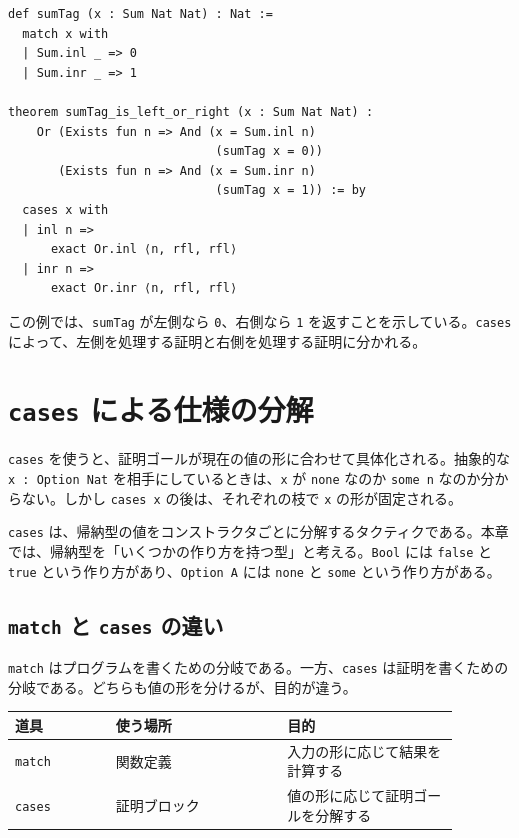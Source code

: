 \begin{listing}[htbp]
\begin{verbatim}
def sumTag (x : Sum Nat Nat) : Nat :=
  match x with
  | Sum.inl _ => 0
  | Sum.inr _ => 1

theorem sumTag_is_left_or_right (x : Sum Nat Nat) :
    Or (Exists fun n => And (x = Sum.inl n)
                             (sumTag x = 0))
       (Exists fun n => And (x = Sum.inr n)
                             (sumTag x = 1)) := by
  cases x with
  | inl n =>
      exact Or.inl ⟨n, rfl, rfl⟩
  | inr n =>
      exact Or.inr ⟨n, rfl, rfl⟩
\end{verbatim}
\caption{\texttt{Sum} の左右ケースを分ける}
\label{lst:ch13-sum-cases}
\end{listing}

この例では、\texttt{sumTag} が左側なら \texttt{0}、右側なら \texttt{1} を返すことを示している。\texttt{cases} によって、左側を処理する証明と右側を処理する証明に分かれる。

\section{\texttt{cases} による仕様の分解}

\texttt{cases} を使うと、証明ゴールが現在の値の形に合わせて具体化される。抽象的な \texttt{x : Option Nat} を相手にしているときは、\texttt{x} が \texttt{none} なのか \texttt{some n} なのか分からない。しかし \texttt{cases x} の後は、それぞれの枝で \texttt{x} の形が固定される。

\begin{definitionbox}
\texttt{cases} は、帰納型の値をコンストラクタごとに分解するタクティクである。本章では、帰納型を「いくつかの作り方を持つ型」と考える。\texttt{Bool} には \texttt{false} と \texttt{true} という作り方があり、\texttt{Option A} には \texttt{none} と \texttt{some} という作り方がある。
\end{definitionbox}

\subsection{\texttt{match} と \texttt{cases} の違い}

\texttt{match} はプログラムを書くための分岐である。一方、\texttt{cases} は証明を書くための分岐である。どちらも値の形を分けるが、目的が違う。

\begin{center}
\begin{tabular}{p{0.20\linewidth}p{0.34\linewidth}p{0.34\linewidth}}
\toprule
道具 & 使う場所 & 目的 \\
\midrule
\texttt{match} & 関数定義 & 入力の形に応じて結果を計算する \\
\texttt{cases} & 証明ブロック & 値の形に応じて証明ゴールを分解する \\
\bottomrule
\end{tabular}
\end{center}

